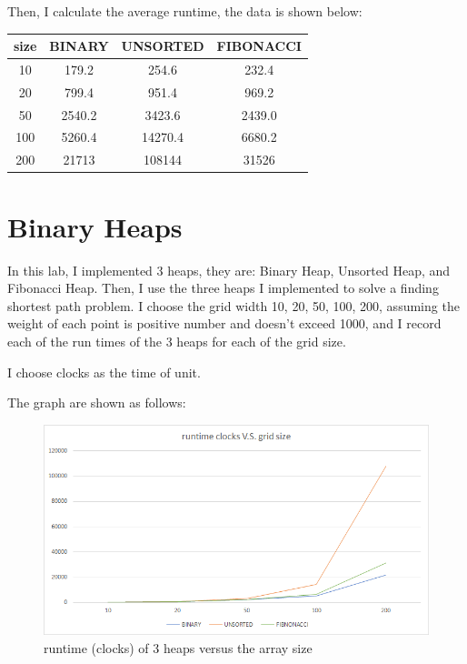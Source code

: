 \documentclass[12pt,a4paper]{article}
\theoremstyle{definition}
\begin{document}
Then, I calculate the average runtime, the data is shown below:
\begin{table}[ht]
	\begin{center}
	\begin{tabular}{|c|c|c|c|}
		\hline
		size & BINARY & UNSORTED & FIBONACCI \\ \hline
		10   & 179.2  & 254.6    & 232.4     \\ \hline
		20   & 799.4  & 951.4    & 969.2     \\ \hline
		50   & 2540.2 & 3423.6   & 2439.0    \\ \hline
		100  & 5260.4 & 14270.4  & 6680.2    \\ \hline
		200  & 21713  & 108144   & 31526     \\ \hline
	\end{tabular}
	\end{center}
\end{table}


\newpage
\section{Binary Heaps}

In this lab, I implemented 3 heaps, they are: Binary Heap, Unsorted Heap, and Fibonacci Heap. Then, I  use the three heaps I implemented to solve a finding shortest path problem.  I choose the grid width 10, 20, 50, 100, 200, assuming the weight of each point is positive number and doesn't exceed 1000, and I record each of the run times of the 3 heaps for each of the grid size.
 
I  choose clocks as the time of unit.
 
The graph are shown as follows:

\begin{figure}[ht]
	\centering
	\includegraphics[scale=2.0]{1.png}
	\caption{runtime (clocks) of 3 heaps versus the array size}
\end{figure}
\end{document}
